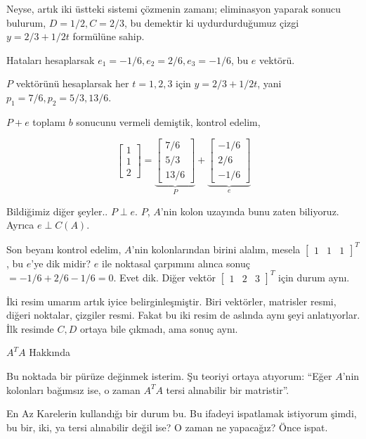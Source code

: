 \documentclass[12pt,fleqn]{article}\usepackage{../../common}
\begin{document}
Neyse, artık iki üstteki sistemi çözmenin zamanı; eliminasyon yaparak
sonucu bulurum, $D=1/2,C=2/3$, bu demektir ki uydurdurduğumuz çizgi 
$y=2/3+1/2t$ formülüne sahip.

Hataları hesaplarsak $e_1=-1/6,e_2=2/6,e_3=-1/6$, bu $e$ vektörü. 

$P$ vektörünü hesaplarsak her $t=1,2,3$ için $y=2/3+1/2t$, yani
$p_1=7/6,p_2=5/3,13/6$. 

$P+e$ toplamı $b$ sonucunu vermeli demiştik, kontrol edelim,

$$ 
\left[\begin{array}{r}
1 \\ 1 \\ 2
\end{array}\right]
=
\underbrace{
\left[\begin{array}{r}
7/6 \\ 5/3 \\ 13/6
\end{array}\right] 
}_{P}
+ 
\underbrace{
\left[\begin{array}{r}
-1/6 \\ 2/6 \\ -1/6
\end{array}\right]
}_{e}
 $$

Bildiğimiz diğer şeyler.. $P \perp e$. $P$, $A$'nin kolon uzayında bunu zaten
biliyoruz. Ayrıca $e \perp C(A)$.

Son beyanı kontrol edelim, $A$'nin kolonlarından birini alalım, mesela
$\left[\begin{array}{ccc} 1&1&1 \end{array}\right]^T$, bu $e$'ye dik midir?  $e$
ile noktasal çarpımını alınca sonuç $=-1/6+2/6-1/6=0$. Evet dik.  Diğer vektör
$\left[\begin{array}{ccc} 1&2&3 \end{array}\right]^T$ için durum aynı.

İki resim umarım artık iyice belirginleşmiştir. Biri vektörler, matrisler
resmi, diğeri noktalar, çizgiler resmi. Fakat bu iki resim de aslında aynı
şeyi anlatıyorlar. İlk resimde $C,D$ ortaya bile çıkmadı, ama sonuç aynı.

$A^TA$ Hakkında

Bu noktada bir pürüze değinmek isterim. Şu teoriyi ortaya atıyorum: ``Eğer
$A$'nin kolonları bağımsız ise, o zaman $A^TA$ tersi alınabilir bir
matristir''.

En Az Karelerin kullandığı bir durum bu. Bu ifadeyi ispatlamak istiyorum
şimdi, bu bir, iki, ya tersi alınabilir değil ise? O zaman ne yapacağız?
Önce ispat. 
\end{document}
